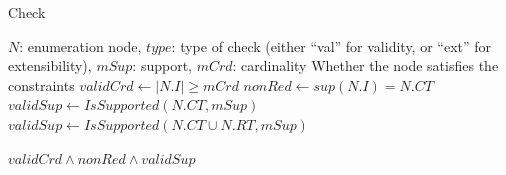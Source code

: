 \documentclass[preprint,12pt,authoryear]{elsarticle} %
\begin{document}
\begin{algorithm}[t]
\scriptsize\centering
\caption{Check}\label{alg:filterE}
\begin{algorithmic}[1]
\Require $N$: enumeration node, $type$: type of check (either ``val'' for validity, or ``ext'' for extensibility), $mSup$: support, $mCrd$: cardinality
\Ensure Whether the node satisfies the constraints
\State $validCrd \gets |N.I| \ge mCrd$   \label{alg:filterE1} 
\State $nonRed \gets sup(N.I) = N.CT$  \label{alg:filterE3}
    \State $validSup \gets IsSupported(N.CT, mSup)$   \label{alg:filterE2Val}
    \State $validSup \gets IsSupported(N.CT \cup N.RT, mSup)$ \label{alg:filterE2Ext}
    \item[]   
\EndIf
\State \Return $ validCrd \wedge nonRed \wedge validSup$ 
\end{algorithmic}
\end{algorithm}
\end{document}
